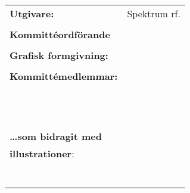 \newdoublepage


\thispagestyle{empty}

\begin{footnotesize}
	
	\newlength{\currentparskip}
	\setlength{\currentparskip}{\parskip} %
	
	\null
	\vfill
	\begin{minipage}{\textwidth}
	
	    \setlength{\parskip}{\currentparskip} %
	    
	    \begin{tabular}{l l}
			\textbf{Utgivare:}				& Spektrum rf.				\\
											&							\\
			\textbf{Kommittéordförande}		& \citeauthor{mccann}		\\
											& 							\\
			\textbf{Grafisk formgivning:}	& \citeauthor{mccann}		\\
											& 							\\
			\textbf{Kommittémedlemmar:}		& \citeauthor{anton_taleiko}			\\
											& \citeauthor{chloe_nozais}			\\
											& \citeauthor{fridlund}			\\
											& \citeauthor{emma_sinisalo}			\\
											& \citeauthor{gabriella_karhulahti}			\\
											& \citeauthor{henrik_stubb}			\\
											& \citeauthor{julia_sevon}			\\
											& \citeauthor{leo_kolev}			\\												
											& \citeauthor{otto_lindblom}			\\	
											& \citeauthor{rasmus_nilsson}			\\
											& \citeauthor{sara_hagstrom}			\\
											& \citeauthor{victor_lindblad}			\\																										&							\\
		\textbf{\dots som bidragit med}	&							\\
		\textbf{illustrationer}:			& \citeauthor{kupi}  		\\
											& \citeauthor{hugo_astrom}    	\\
											& \citeauthor{eva_ahlgren}    	\\
											& \citeauthor{oliver_flinck}    	\\
											& \citeauthor{emil_amnell}    	\\
											& \citeauthor{oskar_flodin}			\\
											& \citeauthor{aslak_fellman}    	\\
											& \citeauthor{mccann}    	\\	
	    \end{tabular}
	    

\end{minipage}
\end{footnotesize}
